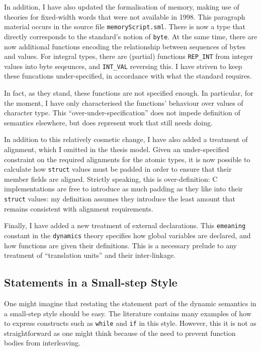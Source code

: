 \documentclass[11pt]{article}
\begin{document}
In addition, I have also updated the formalisation of memory, making
use of theories for fixed-width words that were not available in 1998.
This paragraph material occurs in the source file
\texttt{memoryScript.sml}. There is now a type that directly
corresponds to the standard's notion of \texttt{byte}.  At the same
time, there are now additional functions encoding the relationship
between sequences of bytes and values.  For integral types, there are
(partial) functions \texttt{REP\_INT} from integer values into byte
seqeunces, and \texttt{INT\_VAL} reversing this.  I have striven to
keep these funcations under-specified, in accordance with what the
standard requires.

In fact, as they stand, these functions are not specified enough.  In
particular, for the moment, I have only characterised the functions'
behaviour over values of character type.  This
``over-under-specification'' does not impede definition of semantics
elsewhere, but does represent work that still needs doing.

In addition to this relatively cosmetic change, I have also added a
treatment of alignment, which I omitted in the thesis model.  Given an
under-specified constraint on the required alignments for the atomic
types, it is now possible to calculate how \texttt{struct} values must
be padded in order to ensure that their member fields are aligned.
Strictly speaking, this is over-definition: C implementations are free
to introduce as much padding as they like into their \texttt{struct}
values: my definition assumes they introduce the least amount that
remains consistent with alignment requirements.

Finally, I have added a new treatment of external declarations.  This
\texttt{emeaning} constant in the \texttt{dynamics} theory specifies
how global variables are declared, and how functions are given their
definitions.  This is a necessary prelude to any treatment of
``translation units'' and their inter-linkage.

\subsection{Statements in a Small-step Style}
\label{sec:small-step-stmts}

One might imagine that restating the statement part of the dynamic
semantics in a small-step style should be easy.  The literature
contains many examples of how to express constructs such as
\texttt{while} and \texttt{if} in this style.  However, this it is not
as straightforward as one might think because of the need to prevent
function bodies from interleaving.
\end{document}
